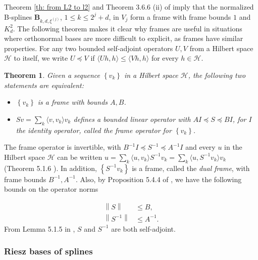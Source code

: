 \documentclass[preprint]{imsart}
\newcommand\norm[1]{\left\lVert#1\right\rVert}
\newtheorem{theorem}{Theorem}[section]
\numberwithin{equation}{section}
\begin{document}
Theorem \ref{th: from L2 to l2} and Theorem 3.6.6 (ii) of \cite{FramesRieszbases} imply that the normalized B-splines $\mathbf{B}_{k,d,\xi^{(j)}}$, $1\leq k\leq 2^j+d$, in $V_{j}$ form a frame with frame bounds $1$ and $K_d^2$. The following theorem makes it clear why frames are useful in situations where orthonormal bases are more difficult to explicit, as frames have similar properties. For any two bounded self-adjoint operators $U,V$ from a Hilbert space $\mathcal{H}$ to itself, we write $U\preceq V$ if $\langle Uh,h\rangle\leq \langle Vh,h\rangle$ for every $h\in\mathcal{H}$.

\begin{theorem}\label{th: frame operator}
    Given a sequence $\left\{v_k\right\}$ in a Hilbert space $\mathcal{H}$, the following two statements are equivalent:
    \begin{itemize}
        \item $\left\{v_k\right\}$ is a frame with bounds $A,B$.
        \item $Sv = \sum_k  \langle v,v_k \rangle v_k$ defines a bounded linear operator with $AI \preceq S \preceq BI$, for $I$ the identity operator, called the frame operator for $\left\{v_k\right\}$.
    \end{itemize}
\end{theorem}

The frame operator is invertible, with $B^{-1}I \preceq S^{-1} \preceq A^{-1}I$ and every $u$ in the Hilbert space $\mathcal{H}$ can be written $u= \sum_k  \langle u,v_k \rangle S^{-1}v_k= \sum_k  \langle u,S^{-1}v_k \rangle v_k$ (Theorem 5.1.6 \cite{FramesRieszbases}). In addition, $\left\{S^{-1}v_k\right\}$ is a frame, called the \textit{dual frame}, with frame bounds $B^{-1}, A^{-1}$. Also, by Proposition 5.4.4 of \cite{FramesRieszbases}, we have the following bounds on the operator norms

\begin{align}
    \norm{S}&\leq B,\\
    \norm{S^{-1}}&\leq A^{-1}.\label{eq: bound operator norm frame inv}
\end{align}
From Lemma 5.1.5 in \cite{FramesRieszbases}, $S$ and $S^{-1}$ are both self-adjoint.

\subsubsection{Riesz bases of splines}\label{sec: Riesz bases of splines}
\end{document}
